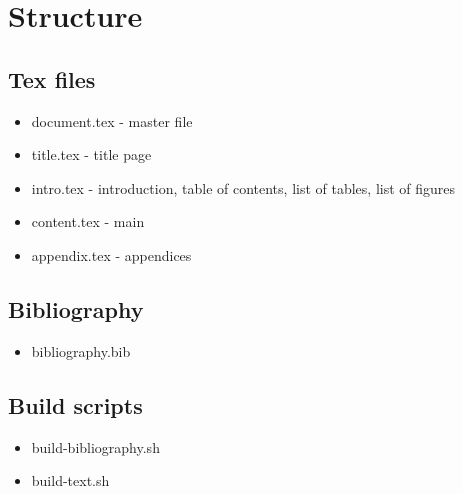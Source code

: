 \section{Structure} %
\label{sec:structure}

\subsection{Tex files} %
\label{sub:tex_files}
\begin{itemize}
  \item document.tex - master file
  \item title.tex - title page
  \item intro.tex - introduction, table of contents, list of tables, list of figures
  \item content.tex - main
  \item appendix.tex - appendices
\end{itemize}


\subsection{Bibliography} %
\label{sub:bibliography}
\begin{itemize}
  \item bibliography.bib
\end{itemize}


\subsection{Build scripts} %
\label{sub:build_scripts}
\begin{itemize}
  \item build-bibliography.sh
  \item build-text.sh
\end{itemize}


